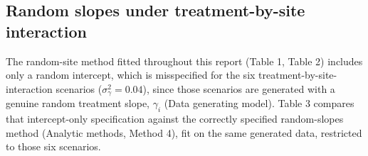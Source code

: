 \documentclass[
  11pt,
]{article}
\begin{document}
\subsection{Random slopes under treatment-by-site interaction}\label{random-slopes-under-treatment-by-site-interaction}

The random-site method fitted throughout this report (Table 1,
Table 2) includes only a random intercept, which is misspecified for
the six treatment-by-site-interaction scenarios (\(\sigma^2_{\gamma} =
0.04\)), since those scenarios are generated with a genuine random
treatment slope, \(\gamma_i\) (Data generating model). Table 3 compares
that intercept-only specification against the correctly specified
random-slopes method (Analytic methods, Method 4), fit on the same
generated data, restricted to those six scenarios.
\end{document}
